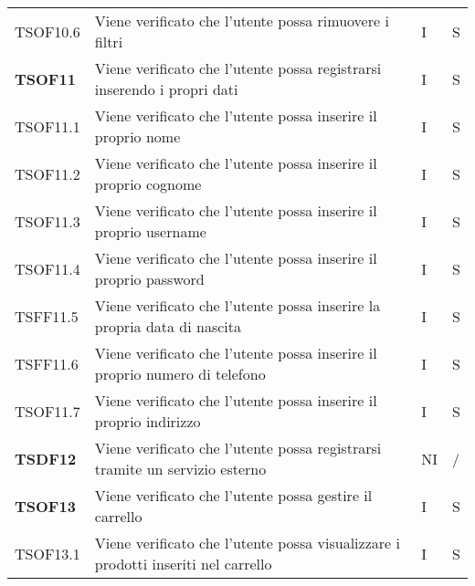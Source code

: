 \begin{center}
\begin{longtable}[!h]{p{60px} p{240px} p{35px} p{35px}}
        TSOF10.6        & Viene verificato che l'utente possa rimuovere i filtri                                                              & I              & S              \\
        \textbf{TSOF11} & Viene verificato che l'utente possa registrarsi inserendo i propri dati                                            & I              & S              \\
        TSOF11.1        & Viene verificato che l'utente possa inserire il proprio nome                                                        & I              & S              \\
        TSOF11.2        & Viene verificato che l'utente possa inserire il proprio cognome                                                     & I              & S              \\
        TSOF11.3        & Viene verificato che l'utente possa inserire il proprio username                                                    & I              & S              \\
        TSOF11.4        & Viene verificato che l'utente possa inserire il proprio password                                                    & I              & S              \\
        TSFF11.5        & Viene verificato che l'utente possa inserire la propria data di nascita                                             & I              & S              \\
        TSFF11.6        & Viene verificato che l'utente possa inserire il proprio numero di telefono                                          & I              & S              \\
        TSOF11.7        & Viene verificato che l'utente possa inserire il proprio indirizzo                                                   & I              & S              \\
        \textbf{TSDF12} & Viene verificato che l'utente possa registrarsi tramite un servizio esterno                                        & NI             & /              \\
        \textbf{TSOF13} & Viene verificato che l'utente possa gestire il carrello                                                             & I              & S              \\
        TSOF13.1        & Viene verificato che l'utente possa visualizzare i prodotti inseriti nel carrello                                   & I              & S              \\

\end{longtable}
\end{center}
